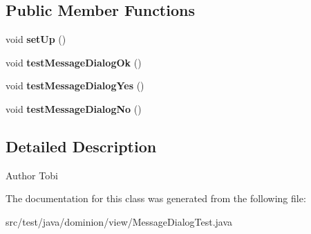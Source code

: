 \subsection*{\-Public \-Member \-Functions}
\begin{DoxyCompactItemize}
\item 
\hypertarget{classdominion_1_1view_1_1MessageDialogTest_aae7d7143dfaa3a2b263ef07969140ebb}{void {\bfseries set\-Up} ()}\label{classdominion_1_1view_1_1MessageDialogTest_aae7d7143dfaa3a2b263ef07969140ebb}

\item 
\hypertarget{classdominion_1_1view_1_1MessageDialogTest_ab6886387c5fa523fb0af99586fd96eb9}{void {\bfseries test\-Message\-Dialog\-Ok} ()}\label{classdominion_1_1view_1_1MessageDialogTest_ab6886387c5fa523fb0af99586fd96eb9}

\item 
\hypertarget{classdominion_1_1view_1_1MessageDialogTest_a34f9b45d16ba55868918accbe30be972}{void {\bfseries test\-Message\-Dialog\-Yes} ()}\label{classdominion_1_1view_1_1MessageDialogTest_a34f9b45d16ba55868918accbe30be972}

\item 
\hypertarget{classdominion_1_1view_1_1MessageDialogTest_ae977290fafcaa45e0985554ab43da719}{void {\bfseries test\-Message\-Dialog\-No} ()}\label{classdominion_1_1view_1_1MessageDialogTest_ae977290fafcaa45e0985554ab43da719}

\end{DoxyCompactItemize}


\subsection{\-Detailed \-Description}
\begin{DoxyAuthor}{\-Author}
\-Tobi 
\end{DoxyAuthor}


\-The documentation for this class was generated from the following file\-:\begin{DoxyCompactItemize}
\item 
src/test/java/dominion/view/\-Message\-Dialog\-Test.\-java\end{DoxyCompactItemize}
